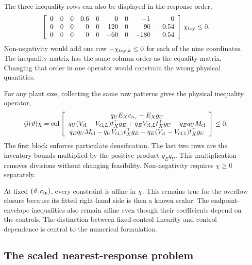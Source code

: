 The three inequality rows can also be displayed in the response order,
\begin{equation}
\equationname{Matrix form of illustrative densification and inventory inequalities}
\left[\begin{array}{rrrrrrrrr}
0&0&0&0.6&0&0&0&-1&0\\
0&0&0&0&0&120&0&90&-0.54\\
0&0&0&0&0&-60&0&-180&0.54
\end{array}\right]\chi_{\rm toy}\le0.
\end{equation}
Non-negativity would add one row $-\chi_{{\rm toy},k}\le0$ for each of the nine coordinates. The inequality matrix has the same column order as the equality matrix. Changing that order in one operator would constrain the wrong physical quantities.

For any plant size, collecting the same row patterns gives the physical inequality operator,
\begin{equation}
\equationname{General densification and clarifier-inventory projection inequalities}
\mathcal G(\vartheta)\chi=
\operatorname{col}\left[
\begin{array}{c}
q_UE_Xc_{n_r}-E_Xg_U\\
q_U(V_{\rm cl}-V_{{\rm cl},L})t_X^\top g_E
+q_EV_{{\rm cl},L}t_X^\top g_U-q_Eq_UM_{\rm cl}\\
q_Eq_UM_{\rm cl}-q_UV_{{\rm cl},1}t_X^\top g_E
-q_E(V_{\rm cl}-V_{{\rm cl},1})t_X^\top g_U
\end{array}\right]\le0.
\label{eq:plant_projection_inequalities}
\end{equation}
The first block enforces particulate densification. The last two rows are the inventory bounds multiplied by the positive product $q_Eq_U$. This multiplication removes divisions without changing feasibility. Non-negativity requires $\chi\ge0$ separately.

At fixed $(\vartheta,c_{\rm in})$, every constraint is affine in $\chi$. This remains true for the overflow closure because its fitted right-hand side is then a known scalar. The endpoint-envelope inequalities also remain affine even though their coefficients depend on the controls. The distinction between fixed-control linearity and control dependence is central to the numerical formulation.

\subsection{The scaled nearest-response problem}

